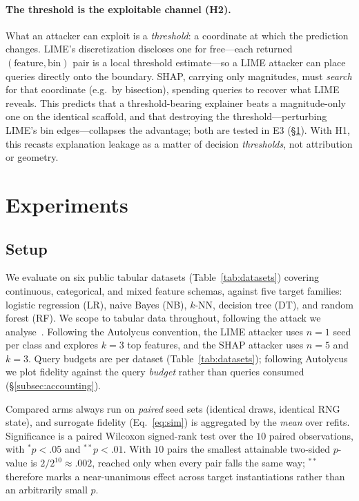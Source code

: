 \documentclass[sigconf,anonymous,review]{acmart}
\begin{document}
\paragraph{The threshold is the exploitable channel (H2).}
What an attacker can exploit is a \emph{threshold}: a coordinate at which the prediction changes.
LIME's discretization discloses one for free---each returned $(\text{feature}, \text{bin})$ pair is
a local threshold estimate---so a LIME attacker can place queries directly onto the boundary. SHAP,
carrying only magnitudes, must \emph{search} for that coordinate (e.g.\ by bisection), spending
queries to recover what LIME reveals. This predicts that a threshold-bearing explainer beats a
magnitude-only one on the identical scaffold, and that destroying the threshold---perturbing LIME's
bin edges---collapses the advantage; both are tested in E3 (\S\ref{sec:experiments}). With H1, this
recasts explanation leakage as a matter of decision \emph{thresholds}, not attribution or geometry.

\section{Experiments}
\label{sec:experiments}
\subsection{Setup}
\label{subsec:setup}
We evaluate on six public tabular datasets (Table~\ref{tab:datasets}) covering continuous,
categorical, and mixed feature schemas, against five target families: logistic regression (LR), naive
Bayes (NB), $k$-NN, decision tree (DT), and random forest (RF). We scope to tabular data throughout,
following the attack we analyse~\cite{oksuz2024autolycus}. Following the Autolycus convention, the
LIME attacker uses $n{=}1$
seed per class and explores $k{=}3$ top features, and the SHAP attacker uses $n{=}5$ and $k{=}3$.
Query budgets are per dataset (Table~\ref{tab:datasets}); following Autolycus we plot fidelity
against the query \emph{budget} rather than queries consumed (\S\ref{subsec:accounting}).

Compared arms always run on \emph{paired} seed sets (identical draws, identical RNG state), and
surrogate fidelity (Eq.~\ref{eq:sim}) is aggregated by the \emph{mean} over refits. Significance is a
paired Wilcoxon signed-rank test over the $10$ paired observations, with $^{*}p{<}.05$ and
$^{**}p{<}.01$. With $10$ pairs the smallest attainable two-sided $p$-value is $2/2^{10}\approx.002$,
reached only when every pair falls the same way; $^{**}$ therefore marks a near-unanimous effect across
target instantiations rather than an arbitrarily small $p$.
\end{document}
